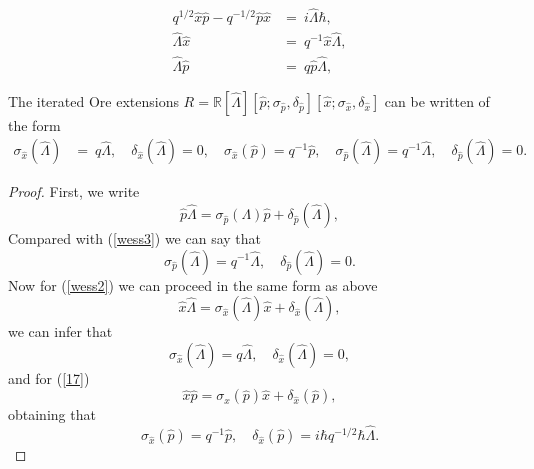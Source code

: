 \documentclass[10pt,a4paper]{amsart}
\begin{document}
\begin{align} \label{17}
q^{1/2}\hat{x}\hat{p}-q^{-1/2}\hat{p}\hat{x} & = \ i\hat{\Lambda}\hbar ,\\
\label{wess2}\hat{\Lambda} \hat{x} & = \ q^{-1}\hat{x}\hat{\Lambda}, \\
\label{wess3}\hat{\Lambda} \hat{p}  & = \ q\hat{p}\hat{\Lambda}, 
\end{align} 

\begin{proposition}\label{Rings-wess}
The iterated Ore extensions $R=\mathbb{R}[\hat{\Lambda}][\hat{p};\sigma_{\hat{p}},\delta_{\hat{p}}][\hat{x};\sigma_{\hat{x}},\delta_{\hat{x}}]$ can be written of the form
\begin{align*}
    \sigma_{\hat{x}}(\hat{\Lambda}) & = \ q\hat{\Lambda}, \quad \delta_{\hat{x}}(\hat{\Lambda})=0, \quad \sigma_{\hat{x}}(\hat{p})=q^{-1}\hat{p}, \quad \sigma_{\hat{p}}(\hat{\Lambda})=q^{-1}\hat{\Lambda}, \quad \delta_{\hat{p}}(\hat{\Lambda})=0.
\end{align*}
\end{proposition}

\begin{proof}
   First, we write 
   \begin{equation*}
       \hat{p}\hat{\Lambda}=\sigma_{\hat{p}}(\Lambda)\hat{p}+\delta_{\hat{p}}(\hat{\Lambda}), 
   \end{equation*}
   Compared with (\ref{wess3}) we can say that
   \begin{equation*}
    \sigma_{\hat{p}}(\hat{\Lambda})=q^{-1}\hat{\Lambda}, \quad \delta_{\hat{p}}(\hat{\Lambda})=0.
   \end{equation*}
   Now for (\ref{wess2}) we can proceed in the same form as above
   \begin{equation*}
       \hat{x}\hat{\Lambda}=\sigma_{\hat{x}}(\hat{\Lambda})\hat{x}+\delta_{\hat{x}}(\hat{\Lambda}),
   \end{equation*}
   we can infer that 
   \begin{equation*}
       \sigma_{\hat{x}}(\hat{\Lambda})=q\hat{\Lambda}, \quad \delta_{\hat{x}}(\hat{\Lambda})=0,
   \end{equation*}
   and for (\ref{17})
   \begin{equation*}
       \hat{x}\hat{p} = \sigma_{x}(\hat{p})\hat{x}+\delta_{\hat{x}}(\hat{p}),
   \end{equation*}
   obtaining that
   \begin{equation*}
     \sigma_{\hat{x}}(\hat{p})=q^{-1}\hat{p}, \quad \delta_{\hat{x}}(\hat{p})=i\hbar q^{-1/2}\hbar\hat{\Lambda}.
   \end{equation*}  
\end{proof}
\end{document}
